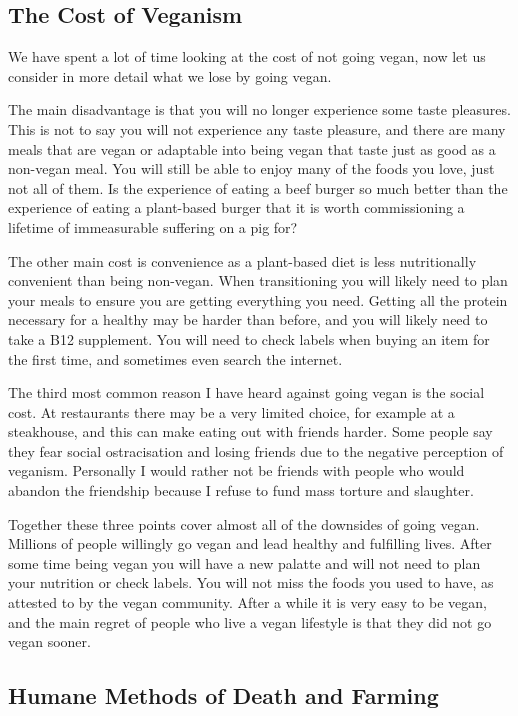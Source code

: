 \subsection{The Cost of Veganism}
\label{sec:TheCostOfVeganism}

We have spent a lot of time looking at the cost of not going vegan, now let us consider in more detail what we lose by going vegan.

The main disadvantage is that you will no longer experience some taste pleasures. This is not to say you will not experience any taste pleasure, and there are many meals that are vegan or adaptable into being vegan that taste just as good as a non-vegan meal. You will still be able to enjoy many of the foods you love, just not all of them. Is the experience of eating a beef burger so much better than the experience of eating a plant-based burger that it is worth commissioning a lifetime of immeasurable suffering on a pig for?

The other main cost is convenience as a plant-based diet is less nutritionally convenient than being non-vegan. When transitioning you will likely need to plan your meals to ensure you are getting everything you need. Getting all the protein necessary for a healthy may be harder than before, and you will likely need to take a B12 supplement. You will need to check labels when buying an item for the first time, and sometimes even search the internet.

The third most common reason I have heard against going vegan is the social cost. At restaurants there may be a very limited choice, for example at a steakhouse, and this can make eating out with friends harder. Some people say they fear social ostracisation and losing friends due to the negative perception of veganism. Personally I would rather not be friends with people who would abandon the friendship because I refuse to fund mass torture and slaughter.

Together these three points cover almost all of the downsides of going vegan. Millions of people willingly go vegan and lead healthy and fulfilling lives. After some time being vegan you will have a new palatte and will not need to plan your nutrition or check labels. You will not miss the foods you used to have, as attested to by the vegan community. After a while it is very easy to be vegan, and the main regret of people who live a vegan lifestyle is that they did not go vegan sooner.

\subsection{Humane Methods of Death and Farming}
\label{sec:HumaneMethodsOfDeathAndFarming}

